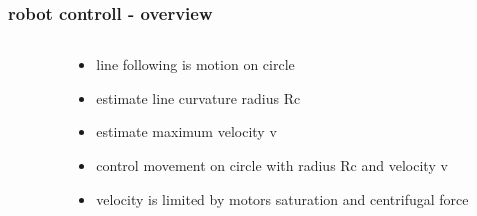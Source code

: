 \documentclass{beamer}
\begin{document}
\begin{frame}
  
  \frametitle{\bf robot controll - overview}

  

  \begin{columns}

    \begin{column}{0.5\textwidth}
    \end{column}

    \begin{column}{0.5\textwidth}
      \begin{itemize}
        \item line following is motion on circle
        \item estimate line curvature radius Rc
        \item estimate maximum velocity v
        \item control movement on circle with radius Rc and velocity v
        \item velocity is limited by motors saturation and centrifugal force
      \end{itemize}
    \end{column}

  \end{columns}


\end{frame}
\end{document}
